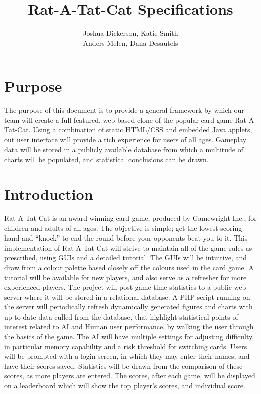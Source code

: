 \documentclass[11pt]{article}
\title{\textbf{Rat-A-Tat-Cat Specifications}}
\author{Joshua Dickerson, Katie Smith\\
		Anders Melen, Dana Desautels}
\date{}
\begin{document}
\maketitle

\section*{Purpose}

The purpose of this document is to provide a general framework by which our team will create a full-featured, web-based clone of the popular card game Rat-A-Tat-Cat. Using a combination of static HTML/CSS and embedded Java applets, out user interface will provide a rich experience for users of all ages. Gameplay data will be stored in a publicly available database from which a multitude of charts will be populated, and statistical conclusions can be drawn. 

\section*{Introduction}
Rat-A-Tat-Cat is an award winning card game, produced by Gamewright Inc.,  for children and adults of all ages. The objective is simple; get the lowest scoring hand and “knock” to end the round before your opponents beat you to it. This implementation of Rat-A-Tat-Cat will strive to maintain all of the game rules as prescribed, using GUIs and a detailed tutorial. The GUIs will be intuitive, and draw from a colour palette based closely off the colours used in the card game. A tutorial will be available for new players, and also serve as a refresher for more experienced players. The project will post game-time statistics to a public web-server where it will be stored in a relational database. 
A PHP script running on the server will periodically refresh dynamically generated figures and charts with up-to-date data culled from the database, that highlight statistical points of interest related to AI and Human user performance.  by walking the user through the basics of the game. The AI will have multiple settings for adjusting difficulty, in particular memory capability and a risk threshold for switching cards. Users will be prompted with a login screen, in which they may enter their names, and have their scores saved. Statistics will be drawn from the comparison of these scores, as more players are entered. The scores, after each game, will be displayed on a leaderboard which will show the top player’s scores, and individual score.
\end{document}
